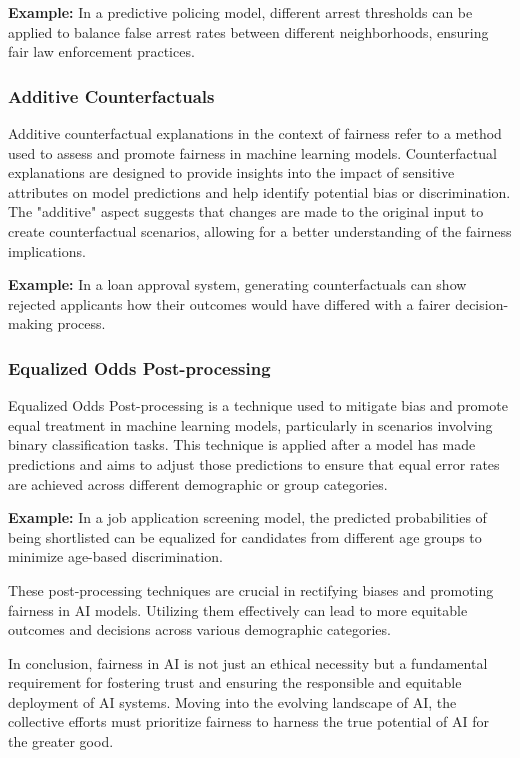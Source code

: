\documentclass[12pt,a4paper,openright,twoside]{book}
\begin{document}
\textbf{Example:} In a predictive policing model, different arrest thresholds can be applied to balance false arrest rates between different neighborhoods, ensuring fair law enforcement practices.

\subsubsection{Additive Counterfactuals}
Additive counterfactual explanations in the context of fairness refer to a method used to assess and promote fairness in machine learning models. Counterfactual explanations are designed to provide insights into the impact of sensitive attributes on model predictions and help identify potential bias or discrimination. The "additive" aspect suggests that changes are made to the original input to create counterfactual scenarios, allowing for a better understanding of the fairness implications. \cite{NIPS2017_a486cd07}

\textbf{Example:} In a loan approval system, generating counterfactuals can show rejected applicants how their outcomes would have differed with a fairer decision-making process.

\subsubsection{Equalized Odds Post-processing}
Equalized Odds Post-processing is a technique used to mitigate bias and promote equal treatment in machine learning models, particularly in scenarios involving binary classification tasks. This technique is applied after a model has made predictions and aims to adjust those predictions to ensure that equal error rates are achieved across different demographic or group categories. \cite{10.1145/3442188.3445902}

\textbf{Example:} In a job application screening model, the predicted probabilities of being shortlisted can be equalized for candidates from different age groups to minimize age-based discrimination.


These post-processing techniques are crucial in rectifying biases and promoting fairness in AI models. Utilizing them effectively can lead to more equitable outcomes and decisions across various demographic categories.

In conclusion, fairness in AI is not just an ethical necessity but a fundamental requirement for fostering trust and ensuring the responsible and equitable deployment of AI systems. Moving into the evolving landscape of AI, the collective efforts must prioritize fairness to harness the true potential of AI for the greater good.
\end{document}
